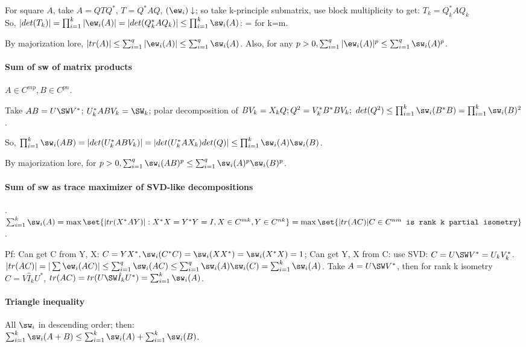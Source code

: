 \documentclass[oneside, article]{memoir}
\begin{document}
For square $A$, take $A = QTQ^{*}$, $T = Q^{*}AQ$, $(\ew_{i}) \downarrow$; so take k-principle submatrix, use block multiplicity to get: $T_{k} = Q_{k}^{*}AQ_{k}$\\
So, $|det(T_{k})| = \prod_{i=1}^{k}|\ew_{i}(A)| = |det(Q_{k}^{*}AQ_{k})| \leq \prod_{i=1}^{k} \sw_{i}(A)$: = for k=m.

By majorization lore, $|tr(A)| \leq \sum_{i=1}^{q} |\ew_{i}(A)| \leq \sum_{i=1}^{q} \sw_{i}(A)$. Also, for any $p>0, \sum_{i=1}^{q} |\ew_{i}(A)|^{p} \leq \sum_{i=1}^{q} \sw_{i}(A)^{p}$.

\paragraph*{Sum of sw of matrix products}
$A \in C^{mp}, B \in C^{pn}$.

Take $AB = U\SW V^{*}$; $U_{k}^{*}ABV_k = \SW_{k}$; polar decomposition of $BV_{k} = X_{k}Q; \\
Q^{2} = V_{k}^{*}B^{*}BV_{k};\ det(Q^{2}) \leq \prod_{i=1}^{k} \sw_{i}(B^{*}B) = \prod_{i=1}^{k}\sw_{i}(B)^{2}$.

So, $\prod_{i=1}^{k} \sw_{i}(AB) = |det(U_{k}^{*}ABV_{k})| = |det(U_{k}^{*}AX_{k})det(Q)| \\
\leq \prod_{i=1}^{k}\sw_{i}(A) \sw_{i}(B)$.

By majorization lore, for $p>0, \sum_{i=1}^{q} \sw_{i}(AB)^{p} \leq \sum_{i=1}^{q} \sw_{i}(A)^{p}\sw_{i}(B)^{p}$.

\paragraph*{Sum of sw as trace maximizer of SVD-like decompositions}
.\\$\sum_{i=1}^{k}\sw_{i}(A) 
= \max \set{|tr(X^{*}AY)|: X^{*}X = Y^{*}Y = I, X \in C^{mk}, Y \in C^{nk}}\\
 = \max \set{|tr(AC)| C \in C^{nm}\texttt{ is rank k partial isometry}}$.

Pf: Can get C from Y, X: $C = YX^{*}, \sw_{i}(C^{*}C) = \sw_{i}(XX^{*})= \sw_{i}(X^{*}X) = 1$; Can get Y, X from C: use SVD: $C = U\SW V^{*} = U_{k}V^{*}_{k}$. $|tr(AC)| = |\sum \ew_{i}(AC)| \leq \sum_{i=1}^{q} \sw_{i}(AC) \leq \sum_{i=1}^{q}\sw_{i}(A) \sw_{i}(C) = \sum_{i=1}^{k}\sw_{i}(A)$. Take $A = U\SW V^{*}$, then for rank k isometry $C = V\hat{I}_{k}U^{*}$, $tr(AC) = tr(U\SW\hat{I}_{k}U^{*}) = \sum_{i=1}^{k}\sw_{i}(A)$.

\paragraph*{Triangle inequality}
All $\sw_{i}$ in descending order; then: \\
$\sum_{i=1}^{k}\sw_{i}(A+B) \leq \sum_{i=1}^{k}\sw_{i}(A) + \sum_{i=1}^{k}\sw_{i}(B)$.
\end{document}
